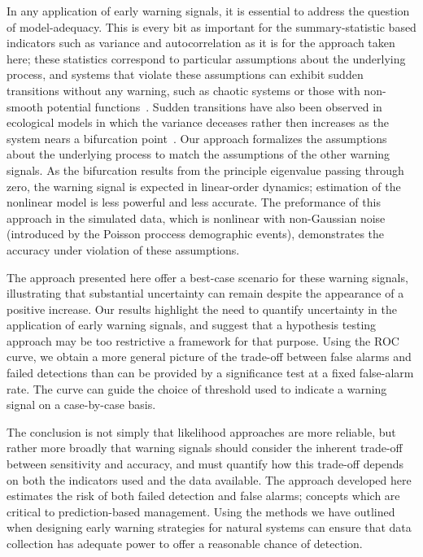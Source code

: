 \documentclass{pnastwo}
\begin{document}
\begin{article}
In any application of early warning signals, it is essential to address the question of model-adequacy.  
This is every bit as important for the summary-statistic based indicators such as variance and autocorrelation
as it is for the approach taken here; these statistics correspond to particular assumptions about the underlying process,
and systems that violate these assumptions can exhibit sudden transitions without any warning,
such as chaotic systems or those with non-smooth potential functions~\cite{Hastings2010}.
Sudden transitions have also been observed in ecological models in which 
the variance deceases rather then increases as the system nears a bifurcation point~\cite{Schreiber2003, Schreiber2008}.  
Our approach formalizes the assumptions about the underlying process to match the assumptions of the other warning signals.  
As the bifurcation results from the principle eigenvalue passing through zero, 
the warning signal is expected in linear-order dynamics;
estimation of the nonlinear model is less powerful and less accurate.  
The preformance of this approach in the simulated data, which is nonlinear with non-Gaussian noise 
(introduced by the Poisson proccess demographic events), 
demonstrates the accuracy under violation of these assumptions.  


The approach presented here offer a best-case scenario for these warning signals,
illustrating that substantial uncertainty can remain despite the appearance of a positive increase.
Our results highlight the need to quantify uncertainty in the application of early warning signals,
and suggest that a hypothesis testing approach may be too restrictive a framework for that purpose.
Using the ROC curve, we obtain a more general picture of the trade-off between false alarms and failed detections
than can be provided by a significance test at a fixed false-alarm rate.  
The curve can guide the choice of threshold used to indicate a warning signal on a case-by-case basis.  


The conclusion is not simply that likelihood approaches are more reliable, 
but rather more broadly that warning signals should consider
the inherent trade-off between sensitivity and accuracy,
and must quantify how this trade-off depends on both the indicators used and the data available.  
The approach developed here estimates the risk of both failed detection and false alarms;
concepts which are critical to prediction-based management.  
Using the methods we have outlined when designing early warning strategies for natural systems
can ensure that data collection has adequate power to offer a reasonable chance of detection. 


\end{article}
\end{document}
